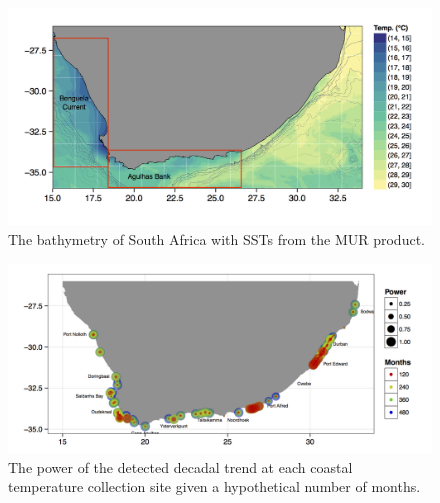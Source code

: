 \documentclass[
]{book}
\begin{document}
\begin{figure}

{\centering \includegraphics[width=1\linewidth]{figures/MUR_bathy_plot_discrete_20090228} 

}

\caption{The bathymetry of South Africa with SSTs from the MUR product.}\label{fig:example10}
\end{figure}

\begin{figure}

{\centering \includegraphics[width=1\linewidth]{figures/sw-fig-7-1} 

}

\caption{The power of the detected decadal trend at each coastal temperature collection site given a hypothetical number of months.}\label{fig:example13}
\end{figure}
\end{document}
